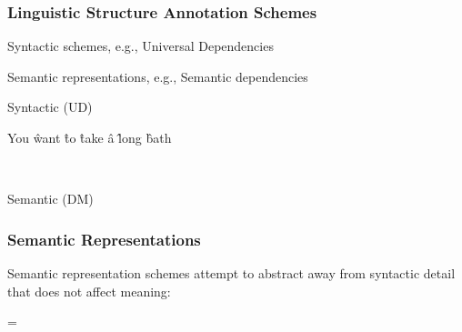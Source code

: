 \documentclass[t,xcolor={svgnames}]{beamer}
\begin{document}
\begin{frame}
\frametitle{Linguistic Structure Annotation Schemes}
Syntactic schemes, e.g., Universal Dependencies \cite{nivre2016universal}

Semantic representations, e.g., Semantic dependencies \cite{oepen2016towards}
\vfill

	\begin{flushleft}
	Syntactic (UD)\\
	\end{flushleft}
	\begin{adjustbox}{center}
	\begin{dependency}
		\begin{deptext}[column sep=1.5em,ampersand replacement=\^,font=\rmfamily]
		You \^ want \^ to \^ take \^ a \^ long \^ bath \\
		\end{deptext}
	\end{dependency}
	\end{adjustbox}\\
	\begin{flushright}
	\color{red}Semantic (DM)
	\end{flushright}
\end{frame}


\begin{frame}
	\frametitle{Semantic Representations}
Semantic representation schemes attempt to
abstract away from syntactic detail that does not affect meaning:
\begin{center}
	 = 
\end{center}
\end{frame}
\end{document}
